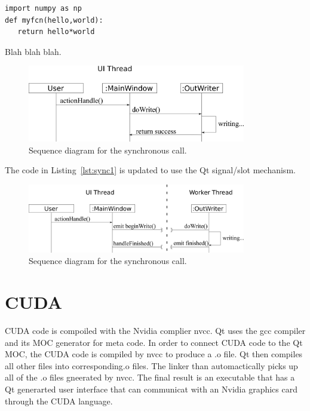 \begin{listing}
\begin{verbatim}
import numpy as np
def myfcn(hello,world):
   return hello*world
\end{verbatim}
\caption{Blah blah blah.}\label{lst:sync1}
\end{listing}

\begin{figure}[tb]
  \begin{center}
   \includegraphics[width=3.75in]{figs/writer_sync}
  \end{center}
  \caption{Sequence diagram for the synchronous call.}
\label{fig:sync1}
\end{figure}%

The code in Listing~\ref{lst:sync1} is updated to use the Qt signal/slot mechanism.

\begin{figure}[tb]
  \begin{center}
   \includegraphics[width=3.75in]{figs/writer_async}
  \end{center}
  \caption{Sequence diagram for the synchronous call.}
\label{fig:async1}
\end{figure}%

\section{CUDA}
CUDA code is compoiled with the Nvidia complier nvcc. Qt uses the gcc compiler and its MOC generator for meta code. In order to connect CUDA code to the Qt MOC, the CUDA code is compiled by nvcc to produce a .o file. Qt then compiles all other files into corresponding.o files. The linker than automactically picks up all of the .o files gneerated by nvcc. The final result is an executable that has a Qt generarted user interface that can communicat with an Nvidia graphics card through the CUDA language.

